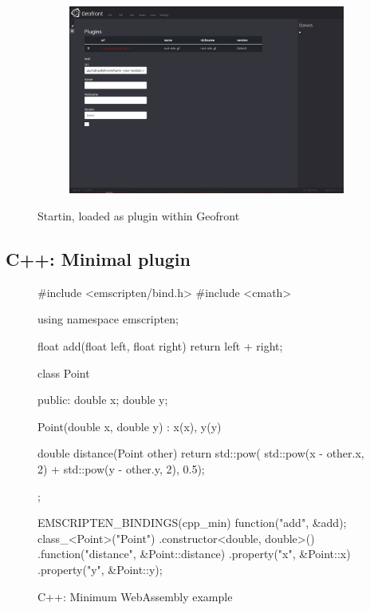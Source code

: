 \begin{figure}
\begin{subfigure}[b]{0.90\linewidth}
    \includegraphics[width=\linewidth]{2.PNG}
  \end{subfigure}%
  \caption[Types of \ac{vpl}s]{Startin, loaded as plugin within Geofront}%
  \label{fig:startin-plugin}
  \end{figure}

\subsection{C++: Minimal plugin}  

\begin{figure}
\centering
\begin{code}
#include <emscripten/bind.h>
#include <cmath>

using namespace emscripten;

float add(float left, float right) {
    return left + right;
}

class Point {
public:
    double x;
    double y;

    Point(double x, double y) :
        x(x),
        y(y) {}

    double distance(Point other) {
        return std::pow(
            std::pow(x - other.x, 2) + std::pow(y - other.y, 2), 
            0.5);
    }
};

EMSCRIPTEN_BINDINGS(cpp_min) {
    function("add", &add);
    class_<Point>("Point")
        .constructor<double, double>()
        .function("distance", &Point::distance)
        .property("x", &Point::x)
        .property("y", &Point::y);
}
\end{code}
\caption{C++: Minimum WebAssembly example}
\label{fig:minimum-cpp-wasm}
\end{figure}

